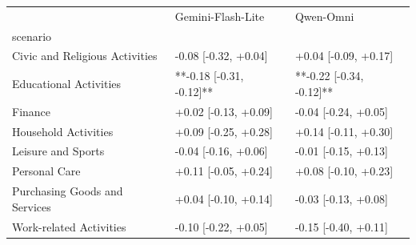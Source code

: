 \begin{tabular}{lll}
\toprule
 & Gemini-Flash-Lite & Qwen-Omni \\
scenario &  &  \\
\midrule
Civic and Religious Activities & -0.08 [-0.32, +0.04] & +0.04 [-0.09, +0.17] \\
Educational Activities & **-0.18 [-0.31, -0.12]** & **-0.22 [-0.34, -0.12]** \\
Finance & +0.02 [-0.13, +0.09] & -0.04 [-0.24, +0.05] \\
Household Activities & +0.09 [-0.25, +0.28] & +0.14 [-0.11, +0.30] \\
Leisure and Sports & -0.04 [-0.16, +0.06] & -0.01 [-0.15, +0.13] \\
Personal Care & +0.11 [-0.05, +0.24] & +0.08 [-0.10, +0.23] \\
Purchasing Goods and Services & +0.04 [-0.10, +0.14] & -0.03 [-0.13, +0.08] \\
Work-related Activities & -0.10 [-0.22, +0.05] & -0.15 [-0.40, +0.11] \\
\bottomrule
\end{tabular}
